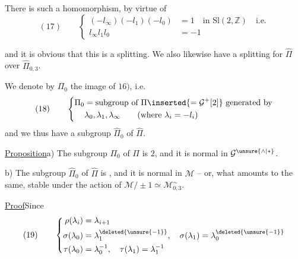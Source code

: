 There  is such a homomorphism, by virtue of
\[
(17)\qquad
\left\{\begin{aligned}
(-l_\infty)(-l_1)(-l_0)&=1\quad\text{in }\mathrm{Sl}(2,\mathbb Z)\quad\text{i.e.}\\
l_\infty l_1l_0&=-1
\end{aligned}\right.
\]
\margin{$)$}

and it is obvious that this is a splitting. We also likewise have a splitting for $\widehat\Pi$ over $\widehat\Pi_{0,3}$.

We denote by $\Pi_0$ the image of $16)$, i.e.
\[
(18)\qquad
\left\{\begin{aligned}
\Pi_0&=\text{subgroup of }\Pi\inserted{=\mathcal{G}^{+}[2]}\text{ generated by}\\
&\lambda_0,\lambda_1,\lambda_\infty\qquad(\text{where }\lambda_i=-l_i)
\end{aligned}\right.
\]
and we thus have a subgroup $\widehat\Pi_0$ of $\widehat\Pi$.

\uline{Proposition}\quad a) The subgroup $\Pi_0$ of $\Pi$ is  $2$, and it is normal in $\mathcal{G}^{\unsure{\wedge|*}}$.

b) The subgroup $\widehat\Pi_0$ of $\widehat\Pi$ is , and it is normal in $\mathcal M$ -- or, what amounts to the same, stable under the action of $\mathcal M/\pm1\simeq\mathcal M_{0,3}^{\sim}$.

\uline{Proof}\quad Since
\[
(19)\qquad
\left\{\begin{aligned}
\rho(\lambda_i)&=\lambda_{i+1}\\
\sigma(\lambda_0)&=\lambda_{1}^{\deleted{\unsure{-1}}},\quad
\sigma(\lambda_1)=\lambda_0^{\deleted{\unsure{-1}}}\\
\tau(\lambda_0)&=\lambda_0^{-1},\quad\tau(\lambda_1)=\lambda_1^{-1}
\end{aligned}\right.
\]


